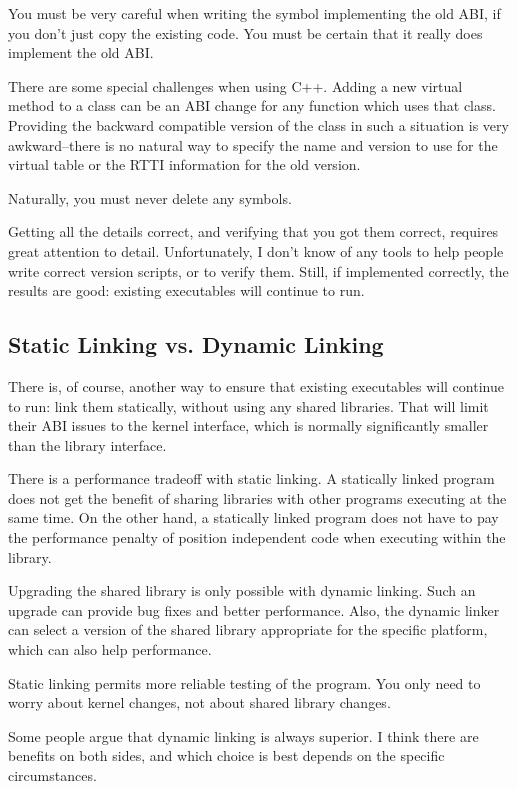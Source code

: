 You must be very careful when writing the symbol implementing the old ABI, if
you don't just copy the existing code. You must be certain that it really does
implement the old ABI.

There are some special challenges when using C++. Adding a new virtual method
to a class can be an ABI change for any function which uses that class.
Providing the backward compatible version of the class in such a situation is
very awkward--there is no natural way to specify the name and version to use
for the virtual table or the RTTI information for the old version.

Naturally, you must never delete any symbols.

Getting all the details correct, and verifying that you got them correct,
requires great attention to detail. Unfortunately, I don't know of any tools
to help people write correct version scripts, or to verify them. Still, if
implemented correctly, the results are good: existing executables will continue
to run.

\subsection{Static Linking vs. Dynamic Linking}

There is, of course, another way to ensure that existing executables will
continue to run: link them statically, without using any shared libraries.
That will limit their ABI issues to the kernel interface, which is normally
significantly smaller than the library interface.

There is a performance tradeoff with static linking. A statically linked
program does not get the benefit of sharing libraries with other programs
executing at the same time. On the other hand, a statically linked program
does not have to pay the performance penalty of position independent code when
executing within the library.

Upgrading the shared library is only possible with dynamic linking. Such
an upgrade can provide bug fixes and better performance. Also, the dynamic
linker can select a version of the shared library appropriate for the specific
platform, which can also help performance.

Static linking permits more reliable testing of the program. You only need to
worry about kernel changes, not about shared library changes.

Some people argue that dynamic linking is always superior. I think there are
benefits on both sides, and which choice is best depends on the specific
circumstances.
